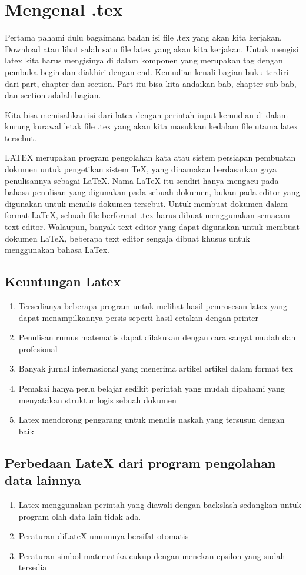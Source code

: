 \section{Mengenal .tex}
Pertama pahami dulu bagaimana badan isi file .tex yang akan kita kerjakan. Download atau lihat salah satu file latex yang akan kita kerjakan. Untuk mengisi latex kita harus mengisinya di dalam komponen  yang merupakan tag dengan pembuka begin dan diakhiri dengan end.
Kemudian kenali bagian buku terdiri dari part, chapter dan section. Part itu bisa kita andaikan bab, chapter sub bab, dan section adalah bagian.

Kita bisa memisahkan isi dari latex dengan perintah input kemudian di dalam kurung kurawal letak file .tex yang akan kita masukkan kedalam file utama latex tersebut.

LATEX merupakan program pengolahan kata atau sistem persiapan pembuatan dokumen untuk pengetikan sistem TeX, yang dinamakan berdasarkan gaya penulisannya sebagai LaTeX. Nama LaTeX itu sendiri hanya mengacu pada bahasa penulisan yang digunakan pada sebuah dokumen, bukan pada editor yang digunakan untuk menulis dokumen tersebut. Untuk membuat dokumen dalam format LaTeX, sebuah file berformat .tex harus dibuat menggunakan semacam text editor. Walaupun, banyak text editor yang dapat digunakan untuk membuat dokumen LaTeX, beberapa text editor sengaja dibuat khusus untuk menggunakan bahasa LaTex.
\subsection{Keuntungan Latex}
\begin{enumerate}
  \item Tersedianya beberapa program untuk melihat hasil pemrosesan latex yang dapat menampilkannya persis seperti hasil cetakan dengan printer
  \item Penulisan rumus matematis dapat dilakukan dengan cara sangat mudah dan profesional
  \item Banyak jurnal internasional yang menerima artikel artikel dalam format tex
  \item Pemakai hanya perlu belajar sedikit perintah yang mudah dipahami yang menyatakan struktur logis sebuah dokumen
  \item Latex mendorong pengarang untuk menulis naskah yang tersusun dengan baik
\end{enumerate}

\subsection{Perbedaan LateX dari program pengolahan data lainnya}
\begin{enumerate}
\item Latex menggunakan perintah yang diawali dengan backslash sedangkan untuk program olah data lain tidak ada.
\item Peraturan diLateX umumnya bersifat otomatis
\item Peraturan simbol matematika cukup dengan menekan epsilon yang sudah tersedia
\end{enumerate}


